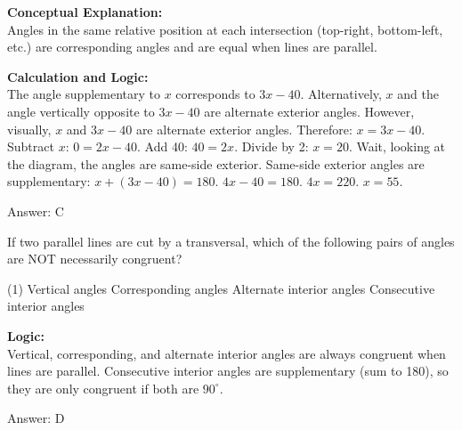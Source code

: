 \documentclass[11pt,paper=a4,answers]{exam}
\begin{document}
\begin{questions}
\begin{solution}
\textbf{Conceptual Explanation:} \\
Angles in the same relative position at each intersection (top-right, bottom-left, etc.) are corresponding angles and are equal when lines are parallel.

\vspace{30pt}

\textbf{Calculation and Logic:} \\
The angle supplementary to $x$ corresponds to $3x - 40$. Alternatively, $x$ and the angle vertically opposite to $3x - 40$ are alternate exterior angles. However, visually, $x$ and $3x - 40$ are alternate exterior angles. Therefore: $x = 3x - 40$. Subtract $x$: $0 = 2x - 40$. Add 40: $40 = 2x$. Divide by 2: $x = 20$. 
Wait, looking at the diagram, the angles are same-side exterior. Same-side exterior angles are supplementary: $x + (3x - 40) = 180$. $4x - 40 = 180$. $4x = 220$. $x = 55$.

\vspace{30pt}

Answer: \colorbox{yellow!100}{C}
\end{solution}

\vspace{60pt}

\question
If two parallel lines are cut by a transversal, which of the following pairs of angles are NOT necessarily congruent?
\begin{tasks}(1)
    \task Vertical angles
    \task Corresponding angles
    \task Alternate interior angles
    \task Consecutive interior angles
\end{tasks}

\begin{solution}
\textbf{Logic:} \\
Vertical, corresponding, and alternate interior angles are always congruent when lines are parallel. Consecutive interior angles are supplementary (sum to 180), so they are only congruent if both are $90^\circ$.

\vspace{30pt}

Answer: \colorbox{yellow!100}{D}
\end{solution}

\vspace{60pt}


\end{questions}
\end{document}

